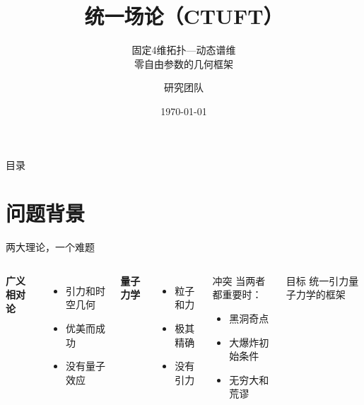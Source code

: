 \documentclass[aspectratio=169]{beamer}
\title[统一场论]{\textbf{统一场论（CTUFT）}}
\subtitle{固定4维拓扑—动态谱维\\零自由参数的几何框架}
\author{研究团队}
\institute{CTUFT研究组}
\date{\today}
\begin{document}
\begin{frame}
\titlepage
\end{frame}

\begin{frame}{目录}
\tableofcontents
\end{frame}

\section{问题背景}

\begin{frame}{两大理论，一个难题}
\begin{columns}
\textbf{广义相对论}
\begin{itemize}
    \item 引力和时空几何
    \item 优美而成功
    \item 没有量子效应
\end{itemize}

\vspace{0.5cm}

\textbf{量子力学}
\begin{itemize}
    \item 粒子和力
    \item 极其精确
    \item 没有引力
\end{itemize}

\begin{block}{冲突}
当两者都重要时：
\begin{itemize}
    \item 黑洞奇点
    \item 大爆炸初始条件
    \item 无穷大和荒谬
\end{itemize}
\end{block}

\begin{alertblock}{目标}
统一引力量子力学的框架
\end{alertblock}
\end{columns}
\end{frame}
\end{document}
